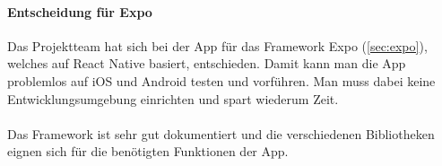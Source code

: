 \paragraph{Entscheidung für Expo}Das Projektteam hat sich bei der App für das Framework Expo (\ref{sec:expo}), welches auf React Native basiert, entschieden. Damit kann man die App problemlos auf iOS und Android testen und vorführen. Man muss dabei keine Entwicklungsumgebung einrichten und spart wiederum Zeit.\\ \\
Das Framework ist sehr gut dokumentiert und die verschiedenen Bibliotheken eignen sich für die benötigten Funktionen der App.\\
